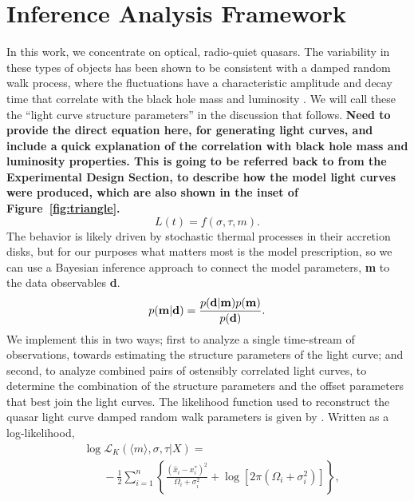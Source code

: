 \documentclass{emulateapj}
\begin{document}
\section{Inference Analysis Framework}\label{sec:tdanalysis}

In this work, we concentrate on optical, radio-quiet quasars. The
variability in these types of objects has been shown to be consistent
with a damped random walk process, where the fluctuations have a
characteristic amplitude and decay time that correlate with the black
hole mass and luminosity \citep{Kelly2009a}.  We will call these the
``light curve structure parameters'' in the discussion that
follows. {\bf Need to provide the direct equation here, for generating
  light curves, and include a quick explanation of the correlation
  with black hole mass and luminosity properties. This is going to be
  referred back to from the Experimental Design Section, to describe
  how the model light curves were produced, which are also shown in
  the inset of Figure~\ref{fig:triangle}.} 
\begin{equation}
L(t)=f(\sigma,\tau,m).\label{eq:lightcurve}
\end{equation}
The behavior is likely
driven by stochastic thermal processes in their accretion disks, but
for our purposes what matters most is the model prescription, so we
can use a Bayesian inference approach to connect the model parameters,
{\bf m} to the data observables {\bf d}.
\begin{equation}
p({\mathbf m} | {\mathbf d}) = 
{{p({\mathbf d} | {\mathbf m})p({\mathbf m})}
\over{p({\mathbf  d})}}. \nonumber 
\end{equation}
We implement this in two ways; first to analyze a single time-stream
of observations, towards estimating the structure parameters of the
light curve; and second, to analyze combined pairs of ostensibly
correlated light curves, to determine the combination of the structure
parameters and the offset parameters that best join the light
curves. The likelihood function used to reconstruct the quasar light
curve damped random walk parameters is given by
\citet{Kelly2009a}. Written as a
log-likelihood,
\begin{align} 
& \log\mathcal{L}_{K}(\langle m\rangle, \sigma,\tau | X) =\nonumber \\
& \ \ \ \ \ \ \ \ -\frac{1}{2}\sum_{i=1}^{n}\left\{
\frac{\left(\hat{x}_i-x^{*}_i\right)^2}{\Omega_i+\sigma_i^2} 
+ 
\log\left[2\pi\left(\Omega_i+\sigma_i^2\right)\right]
\right\}, 
\end{align}
\end{document}
